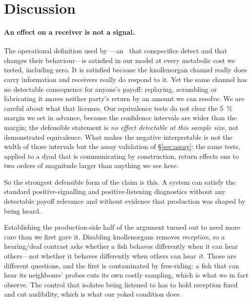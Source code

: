 \section{Discussion}

\paragraph{An effect on a receiver is not a signal.}
The operational definition used by \citet{singh2025active}---an \eod\ that
conspecifics detect and that changes their behaviour---is satisfied in our model
at every metabolic cost we tested, including zero. It is satisfied because the
knollenorgan channel really does carry information and receivers really do
respond to it. Yet the same channel has no detectable consequence for anyone's
payoff: replaying, scrambling or fabricating it moves neither party's return by
an amount we can resolve. We are careful about what that licenses. Our
equivalence tests do not clear the \SI{5}{\percent} margin we set in advance,
because the confidence intervals are wider than the margin; the defensible
statement is \emph{no effect detectable at this sample size}, not demonstrated
equivalence. What makes the negative interpretable is not the width of those
intervals but the assay validation of \S\ref{sec:assay}: the same tests, applied
to a dyad that is communicating by construction, return effects one to two orders
of magnitude larger than anything we see here.

So the strongest defensible form of the claim is this. A system can satisfy the
standard positive-signalling and positive-listening diagnostics without any
detectable payoff relevance and without evidence that production was shaped by
being heard.

Establishing the production-side half of the argument turned out to need more
care than we first gave it. Disabling knollenorgans removes \emph{reception}, so
a hearing/deaf contrast asks whether a fish behaves differently when it can hear
others---not whether it behaves differently when others can hear \emph{it}. Those
are different questions, and the first is contaminated by free-riding: a fish
that can hear its neighbours' probes cuts its own costly sampling, which is what
we in fact observe. The control that isolates being listened to has to hold
reception fixed and cut audibility, which is what our yoked condition does.

